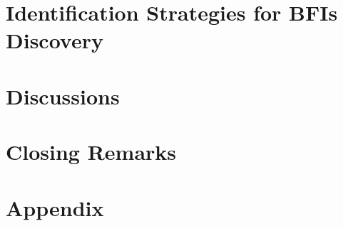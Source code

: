 \documentclass[]{report}
\begin{document}
%

%


%
\chapter{Identification Strategies for BFIs Discovery}



\chapter{Discussions}

\chapter{Closing Remarks}
\section{}

\chapter{Appendix}
\end{document}
